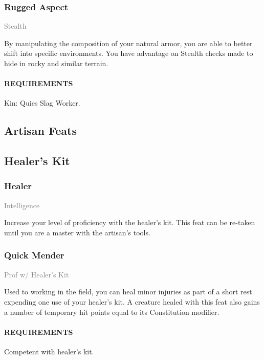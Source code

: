     \subsubsection{Rugged Aspect} \label{feat::ruggedaspect}
    \small{\textcolor{gray}{Stealth}}

    \normalsize
    By manipulating the composition of your natural armor, you are able to better shift into specific environments.
    You have advantage on Stealth checks made to hide in rocky and similar terrain.
    \paragraph{REQUIREMENTS} Kin: Quies Slag Worker.


\subsection{Artisan Feats}
\subsection*{Healer's Kit}
    \subsubsection{Healer} \label{feat::healer}
    \small{\textcolor{gray}{Intelligence}} %

    \normalsize
    Increase your level of proficiency with the healer's kit.
    This feat can be re-taken until you are a master with the artisan's tools.

    \subsubsection{Quick Mender} \label{feat::quickmender}
    \small{\textcolor{gray}{Prof w/ Healer's Kit}}

    \normalsize
    Used to working in the field, you can heal minor injuries as part of a short rest expending one use of your healer's kit.
    A creature healed with this feat also gains a number of temporary hit points equal to its Constitution modifier.
    \paragraph{REQUIREMENTS} Competent with healer's kit.

